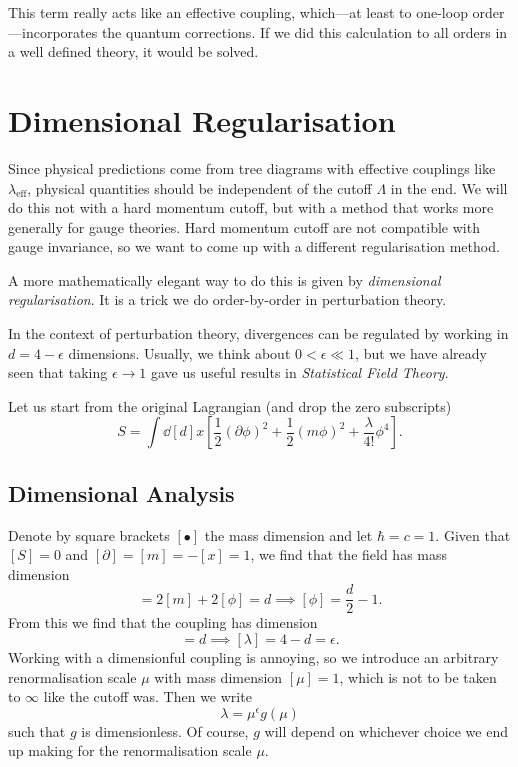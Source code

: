 This term really acts like an effective coupling, which---at least to one-loop order---incorporates the quantum corrections.
If we did this calculation to all orders in a well defined theory, it would be solved.

\section{Dimensional Regularisation}%
\label{sec:dimensional_regularisation}

Since physical predictions come from tree diagrams with effective couplings like $\lambda_{\text{eff}}$, physical quantities should be independent of the cutoff $\Lambda$ in the end.
We will do this not with a hard momentum cutoff, but with a method that works more generally for gauge theories.
Hard momentum cutoff are not compatible with gauge invariance, so we want to come up with a different regularisation method.

A more mathematically elegant way to do this is given by \emph{dimensional regularisation}.
It is a trick we do order-by-order in perturbation theory.

In the context of perturbation theory, divergences can be regulated by working in $d = 4 - \epsilon$ dimensions.
Usually, we think about  $0 < \epsilon \ll 1$, but we have already seen that taking $\epsilon \to 1$ gave us useful results in  \emph{Statistical Field Theory}.

Let us start from the original Lagrangian (and drop the zero subscripts)
\begin{equation}
  S = \int \dd[d]{x} \left[ \frac{1}{2} (\partial \phi)^2 + \frac{1}{2} (m \phi)^2 + \frac{\lambda}{4!} \phi^4 \right].
\end{equation}

\subsection{Dimensional Analysis}%
\label{sub:dimensional_analysis}

Denote by square brackets $[\bullet]$ the mass dimension and let $\hbar = c = 1$.
Given that $[S] = 0$ and $[\partial] = [m] = -[x] = 1$, we find that the field has mass dimension
\begin{equation}
  [m^2 \phi^2] = 2[m] + 2[\phi] = d \implies [\phi] = \frac{d}{2} -1.
\end{equation}
From this we find that the coupling has dimension
\begin{equation}
  [\lambda \phi^4] = d \implies [\lambda] = 4 - d = \epsilon.
\end{equation}
Working with a dimensionful coupling is annoying, so we introduce an arbitrary renormalisation scale $\mu$ with mass dimension $[\mu] = 1$, which is not to be taken to $\infty$ like the cutoff was. 
Then we write
\begin{equation}
  \lambda = \mu^\epsilon g(\mu)
\end{equation}
such that $g$ is dimensionless. Of course, $g$ will depend on whichever choice we end up making for the renormalisation scale $\mu$.
